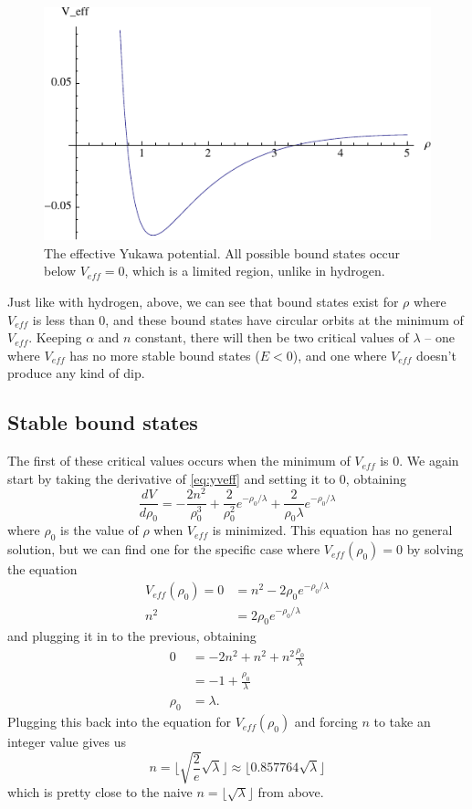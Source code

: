 \documentclass[12pt,twoside]{reedthesis}
\newcommand{\fig}[2]{\begin{figure}\begin{center}#1\end{center}#2\end{figure}}
\begin{document}
\fig{
\includegraphics{Figures/yukawa_Veff}}
{
\label{fig:yveff}
\caption{The effective Yukawa potential. All possible bound states occur below $V_{eff} = 0$, which is a limited region, unlike in hydrogen.}
}
 
Just like with hydrogen, above, we can see that bound states exist for $\rho$ where $V_{eff}$ is less than 0, and these bound states have circular orbits at the minimum of $V_{eff}$. Keeping $\alpha$ and $n$ constant, there will then be two critical values of $\lambda$ -- one where $V_{eff}$ has no more stable bound states ($E < 0$), and one where $V_{eff}$ doesn't produce any kind of dip.
\subsection{Stable bound states}
The first of these critical values occurs when the minimum of $V_{eff}$ is 0. We again start by taking the derivative of \eqref{eq:yveff} and setting it to 0, obtaining
\begin{equation}
\frac{dV}{d\rho_0}= -\frac{2n^2}{\rho_0^3} + \frac{2}{\rho_0^2}e^{-\rho_0/\lambda} + \frac{2}{\rho_0 \lambda} e^{-\rho_0/\lambda}
\label{vmin}
\end{equation}
where $\rho_0$ is the value of $\rho$ when $V_{eff}$ is minimized. This equation has no general solution, but we can find one for the specific case where $V_{eff}(\rho_0) = 0$ by solving the equation
\begin{align}
V_{eff}(\rho_0)=0 &= n^2 - 2\rho_0 e^{-\rho_0/\lambda} \\
n^2 &= 2 \rho_0 e^{-\rho_0/\lambda}
\end{align}
and plugging it in to the previous, obtaining
\begin{align}
0 &= -2n^2 + n^2 +n^2 \frac{\rho_0}{\lambda} \\
&= -1 + \frac{\rho_0}{\lambda} \\
\rho_0 &= \lambda \mbox{.}
\end{align}
Plugging this back into the equation for $V_{eff}(\rho_0)$ and forcing $n$ to take an integer value gives us
\begin{equation}
n = \lfloor \sqrt{\frac{2}{e}}\sqrt{\lambda} \rfloor \approx \lfloor 0.857764\sqrt{\lambda} \rfloor
\end{equation}
which is pretty close to the naive $n = \lfloor \sqrt{\lambda} \rfloor$ from above. 
\end{document}
